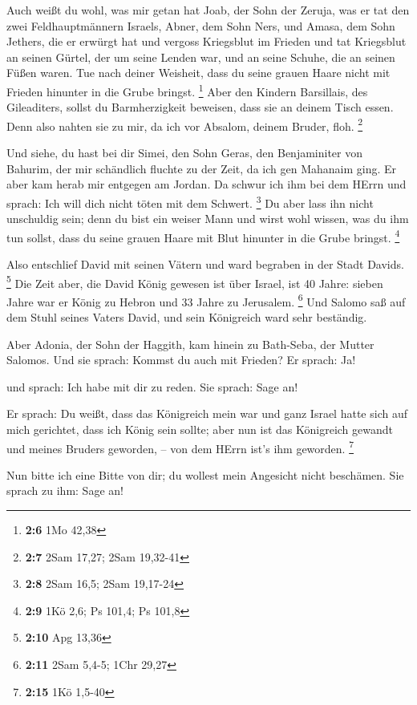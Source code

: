  Auch weißt du wohl, was mir getan hat Joab, der Sohn der
Zeruja, was er tat den zwei Feldhauptmännern Israels, Abner, dem Sohn
Ners, und Amasa, dem Sohn Jethers, die er erwürgt hat und vergoss
Kriegsblut im Frieden und tat Kriegsblut an seinen Gürtel, der um seine
Lenden war, und an seine Schuhe, die an seinen Füßen waren. 
Tue nach deiner Weisheit, dass du seine grauen Haare nicht mit Frieden
hinunter in die Grube bringst. \footnote{\textbf{2:6} 1Mo 42,38}
 Aber den Kindern Barsillais, des Gileaditers, sollst du
Barmherzigkeit beweisen, dass sie an deinem Tisch essen. Denn also
nahten sie zu mir, da ich vor Absalom, deinem Bruder, floh. \footnote{\textbf{2:7}
  2Sam 17,27; 2Sam 19,32-41}

 Und siehe, du hast bei dir Simei, den Sohn Geras, den
Benjaminiter von Bahurim, der mir schändlich fluchte zu der Zeit, da ich
gen Mahanaim ging. Er aber kam herab mir entgegen am Jordan. Da schwur
ich ihm bei dem HErrn und sprach: Ich will dich nicht töten mit dem
Schwert. \footnote{\textbf{2:8} 2Sam 16,5; 2Sam 19,17-24} 
Du aber lass ihn nicht unschuldig sein; denn du bist ein weiser Mann und
wirst wohl wissen, was du ihm tun sollst, dass du seine grauen Haare mit
Blut hinunter in die Grube bringst. \footnote{\textbf{2:9} 1Kö 2,6; Ps
  101,4; Ps 101,8}

 Also entschlief David mit seinen Vätern und ward begraben
in der Stadt Davids. \footnote{\textbf{2:10} Apg 13,36} 
Die Zeit aber, die David König gewesen ist über Israel, ist 40 Jahre:
sieben Jahre war er König zu Hebron und 33 Jahre zu Jerusalem.
\footnote{\textbf{2:11} 2Sam 5,4-5; 1Chr 29,27}  Und Salomo
saß auf dem Stuhl seines Vaters David, und sein Königreich ward sehr
beständig.

 Aber Adonia, der Sohn der Haggith, kam hinein zu
Bath-Seba, der Mutter Salomos. Und sie sprach: Kommst du auch mit
Frieden? Er sprach: Ja!

 und sprach: Ich habe mit dir zu reden. Sie sprach: Sage
an!

 Er sprach: Du weißt, dass das Königreich mein war und ganz
Israel hatte sich auf mich gerichtet, dass ich König sein sollte; aber
nun ist das Königreich gewandt und meines Bruders geworden, -- von dem
HErrn ist's ihm geworden. \footnote{\textbf{2:15} 1Kö 1,5-40}

 Nun bitte ich eine Bitte von dir; du wollest mein
Angesicht nicht beschämen. Sie sprach zu ihm: Sage an!

